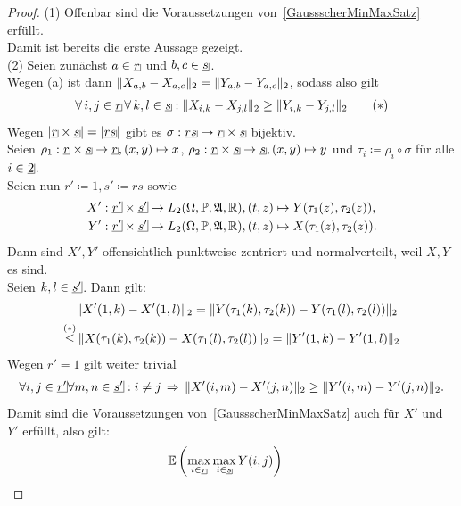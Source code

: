 \begin{proof}
(1) Offenbar sind die Voraussetzungen von~\ref{GaussscherMinMaxSatz} erfüllt.\\
Damit ist bereits die erste Aussage gezeigt.\\
(2) Seien zunächst $a \in \haken r$ und $b, c \in \haken s$.\\
Wegen (a) ist dann $\lVert X_{a,b}-X_{a,c}\rVert_2 = \lVert Y_{a,b} -Y_{a,c}\rVert_2$, sodass
also gilt 
\begin{align}
\forall\, i, j \in \haken r\,\forall\, k, l \in \haken s:
\norm{X_{i,k}-X_{j,l}}_2 \ge \norm{Y_{i,k}-Y_{j,l}}_2 \tag{$\ast$}
\end{align}
Wegen $\abs{\haken r \times \haken s}= \abs{\haken{rs}}$ gibt es
$\sigma: \haken {rs} \rightarrow \haken r \times \haken s$ bijektiv.\\
Seien $\rho_1: \haken r \times \haken s \rightarrow \haken r,(x, y) \mapsto x$,
$\rho_2: \haken r \times \haken s \rightarrow \haken s, (x, y) \mapsto y$ und
$\tau_i\coloneqq  \rho_i \circ \sigma$ für alle $i \in \haken 2$.\\
Seien nun $r'\coloneqq 1, s'\coloneqq  rs$ sowie
\begin{align*}
X' & :\haken {r'}\times \haken {s'} \rightarrow L_2(\Omega, \Prim, \mfa, \R),
(t,z) \mapsto Y(\tau_1(z), \tau_2(z))\text,\\
Y' & :\haken {r'}\times \haken {s'} \rightarrow L_2(\Omega, \Prim, \mfa, \R),
(t,z) \mapsto X(\tau_1(z), \tau_2(z))\text.
\end{align*}
Dann sind $X', Y'$ offensichtlich punktweise zentriert und
normalverteilt, weil $X, Y$ es sind.\\
Seien $k, l \in \haken {s'}$. Dann gilt:
\begin{align*}
&\lVert X'(1,k)-X'(1, l)\rVert_2 = \lVert Y(\tau_1(k), \tau_2(k))
- Y(\tau_1(l), \tau_2(l))\rVert_2\\
\overset{(\ast)}\le &\,
\lVert X(\tau_1(k), \tau_2(k))- X(\tau_1(l), \tau_2(l))\rVert_2
= \lVert Y'(1,k)-Y'(1, l)\rVert_2
\end{align*}
Wegen $r' = 1$ gilt weiter trivial
\begin{align*}
\forall i, j \in \haken {r'}\forall m, n \in \haken {s'}:
i \neq j \folgt \norm{X'(i,m)-X'(j,n)}_2 \ge \norm{Y'(i,m)-Y'(j,n)}_2\text.
\end{align*}
Damit sind die Voraussetzungen von~\ref{GaussscherMinMaxSatz} auch für
$X'$ und $Y'$ erfüllt, also gilt:
\begin{align*}
&\E\left(\max_{i \in \haken r}\max_{i \in \haken s} Y(i,j) \right)

\end{align*}
\end{proof}
